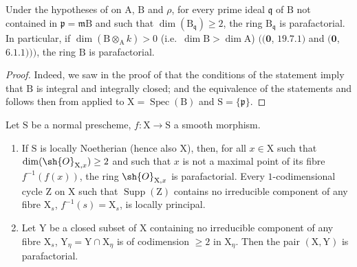 \begin{corollary}[21.14.2]
\label{IV.21.14.2}
Under the hypotheses of  on $\mathrm{A}$, $\mathrm{B}$ and $\rho$, for every prime ideal $\mathfrak{q}$ of $\mathrm{B}$ not contained in $\mathfrak{p}=\mathfrak{m}\mathrm{B}$ and such that $\dim(\mathrm{B}_{\mathfrak{q}})\geq 2$, the ring $\mathrm{B}_{\mathfrak{q}}$ is parafactorial.
In particular, if $\dim(\mathrm{B}\otimes_{\mathrm{A}}k)>0$ (i.e.\ $\dim\mathrm{B}>\dim\mathrm{A}$) $((\mathbf{0}$, $19.7.1)$ and $(\mathbf{0}$, $6.1.1)))$, the ring $\mathrm{B}$ is parafactorial.
\end{corollary}

\begin{proof}
Indeed, we saw in the proof of  that the conditions of the statement imply that $\mathrm{B}$ is integral and integrally closed; and the equivalence of the statements  and  follows then from  applied to $\mathrm{X}=\operatorname{Spec}(\mathrm{B})$ and $\mathrm{S}=\{\mathfrak{p}\}$.
\end{proof}

\begin{proposition}[21.14.3]
\label{IV.21.14.3}
Let $\mathrm{S}$ be a normal prescheme, $f:\mathrm{X}\to\mathrm{S}$ a smooth morphism.
\begin{enumerate}[label=(\roman*)]
  \item If $\mathrm{S}$ is locally Noetherian (hence also $\mathrm{X}$), then, for all $x\in\mathrm{X}$ such that $\dim(\sh{O}_{\mathrm{X},x})\geq 2$ and such that $x$ is not a maximal point of its fibre $f^{-1}(f(x))$, the ring $\sh{O}_{\mathrm{X},x}$ is parafactorial.
  Every $1$-codimensional cycle $\mathrm{Z}$ on $\mathrm{X}$ such that $\operatorname{Supp}(\mathrm{Z})$ contains no irreducible component of any fibre $\mathrm{X}_s$, $f^{-1}(s)=\mathrm{X}_s$, is locally principal.
  \item Let $\mathrm{Y}$ be a closed subset of $\mathrm{X}$ containing no irreducible component of any fibre $\mathrm{X}_s$, $\mathrm{Y}_\eta=\mathrm{Y}\cap\mathrm{X}_\eta$ is of codimension $\geq 2$ in $\mathrm{X}_\eta$.
  Then the pair $(\mathrm{X},\mathrm{Y})$ is parafactorial.
\end{enumerate}
\end{proposition}

